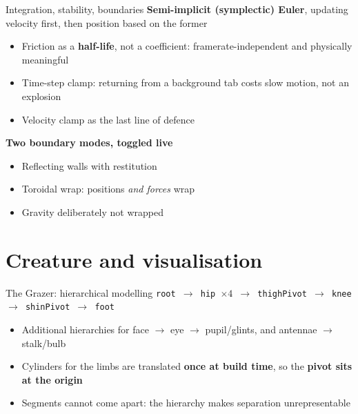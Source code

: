 \documentclass[10pt]{beamer}
\begin{document}
\begin{frame}{Integration, stability, boundaries}
	\textbf{Semi-implicit (symplectic) Euler}, updating velocity first, then position based on the former
	\begin{itemize}
		\item Friction as a \textbf{half-life}, not a coefficient: framerate-independent and physically meaningful
		\item Time-step clamp: returning from a background tab costs slow motion, not an explosion
		\item Velocity clamp as the last line of defence
	\end{itemize}
	\vspace{1ex}
	\textbf{Two boundary modes, toggled live}
	\begin{itemize}
		\item Reflecting walls with restitution
		\item Toroidal wrap: positions \emph{and forces} wrap
		\item Gravity deliberately not wrapped
	\end{itemize}
\end{frame}

\section{Creature and visualisation}

\begin{frame}{The Grazer: hierarchical modelling}
	\centering
	\texttt{root $\to$ hip $\times 4$ $\to$ thighPivot $\to$ knee $\to$ shinPivot $\to$ foot}\\
	\vspace{2ex}
	\begin{flushleft}
		\begin{itemize}
			\item Additional hierarchies for face $\to$ eye $\to$ pupil/glints, and antennae $\to$ stalk/bulb
			\item Cylinders for the limbs are translated \textbf{once at build time}, so the \textbf{pivot sits at the origin}

			\item Segments cannot come apart: the hierarchy makes separation unrepresentable
		\end{itemize}
	\end{flushleft}
\end{frame}
\end{document}
